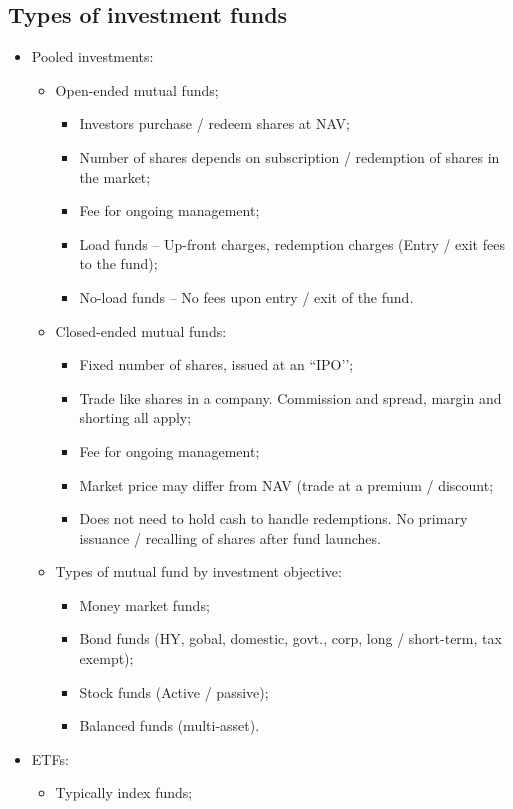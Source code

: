\documentclass[../notes_compiled.tex]{subfiles}
\begin{document}
\subsection{Types of investment funds}
\begin{itemize}
\item Pooled investments:
\begin{itemize}
\item Open-ended mutual funds;
\begin{itemize}
\item Investors purchase / redeem shares at NAV;
\item Number of shares depends on subscription / redemption of shares in the market;
\item Fee for ongoing management;
\item Load funds -- Up-front charges, redemption charges (Entry / exit fees to the fund);
\item No-load funds -- No fees upon entry / exit of the fund.
\end{itemize}
\item Closed-ended mutual funds:
\begin{itemize}
\item Fixed number of shares, issued at an ``IPO’’;
\item Trade like shares in a company. Commission and spread, margin and shorting all apply;
\item Fee for ongoing management;
\item Market price may differ from NAV (trade at a premium / discount;
\item Does not need to hold cash to handle redemptions. No primary issuance / recalling of shares after fund launches.
\end{itemize}
\item Types of mutual fund by investment objective:
\begin{itemize}
\item Money market funds;
\item Bond funds (HY, gobal, domestic, govt., corp, long / short-term, tax exempt);
\item Stock funds (Active / passive);
\item Balanced funds (multi-asset).
\end{itemize}
\end{itemize}
\item ETFs:
\begin{itemize}
\item Typically index funds;

\end{itemize}
\end{itemize}
\end{document}
